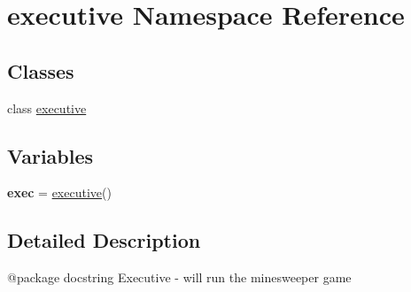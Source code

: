 \hypertarget{namespaceexecutive}{}\section{executive Namespace Reference}
\label{namespaceexecutive}
\subsection*{Classes}
\begin{DoxyCompactItemize}
\item 
class \hyperlink{classexecutive_1_1executive}{executive}
\end{DoxyCompactItemize}
\subsection*{Variables}
\begin{DoxyCompactItemize}
\item 
\mbox{\label{namespaceexecutive_abb6867f565f732bdfd67c820dd4cf5c4}} 
{\bfseries exec} = \hyperlink{classexecutive_1_1executive}{executive}()
\end{DoxyCompactItemize}


\subsection{Detailed Description}
\begin{DoxyVerb}@package docstring
   Executive - will run the minesweeper game
\end{DoxyVerb}
 